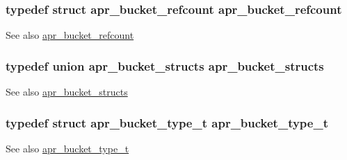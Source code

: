 \subsubsection[{\texorpdfstring{apr\+\_\+bucket\+\_\+refcount}{apr_bucket_refcount}}]{\setlength{\rightskip}{0pt plus 5cm}typedef struct {\bf apr\+\_\+bucket\+\_\+refcount} {\bf apr\+\_\+bucket\+\_\+refcount}}\hypertarget{group__APR__Util__Bucket__Brigades_ga785fd3402961b30315975b0c87c87706}{}\label{group__APR__Util__Bucket__Brigades_ga785fd3402961b30315975b0c87c87706}
\begin{DoxySeeAlso}{See also}
\hyperlink{structapr__bucket__refcount}{apr\+\_\+bucket\+\_\+refcount} 
\end{DoxySeeAlso}
\subsubsection[{\texorpdfstring{apr\+\_\+bucket\+\_\+structs}{apr_bucket_structs}}]{\setlength{\rightskip}{0pt plus 5cm}typedef union {\bf apr\+\_\+bucket\+\_\+structs} {\bf apr\+\_\+bucket\+\_\+structs}}\hypertarget{group__APR__Util__Bucket__Brigades_ga3c0929c971f94de4521fb0fea6fd3209}{}\label{group__APR__Util__Bucket__Brigades_ga3c0929c971f94de4521fb0fea6fd3209}
\begin{DoxySeeAlso}{See also}
\hyperlink{unionapr__bucket__structs}{apr\+\_\+bucket\+\_\+structs} 
\end{DoxySeeAlso}
\subsubsection[{\texorpdfstring{apr\+\_\+bucket\+\_\+type\+\_\+t}{apr_bucket_type_t}}]{\setlength{\rightskip}{0pt plus 5cm}typedef struct {\bf apr\+\_\+bucket\+\_\+type\+\_\+t} {\bf apr\+\_\+bucket\+\_\+type\+\_\+t}}\hypertarget{group__APR__Util__Bucket__Brigades_ga4a152aaf7d851c81af73b7e84dc1a8a2}{}\label{group__APR__Util__Bucket__Brigades_ga4a152aaf7d851c81af73b7e84dc1a8a2}
\begin{DoxySeeAlso}{See also}
\hyperlink{structapr__bucket__type__t}{apr\+\_\+bucket\+\_\+type\+\_\+t} 
\end{DoxySeeAlso}



